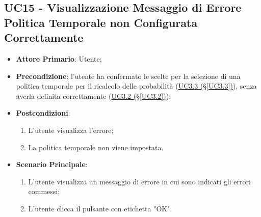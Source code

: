 \pagebreak

\subsection{UC15 - Visualizzazione Messaggio di Errore Politica Temporale non Configurata Correttamente}\label{UC15}
\begin{itemize}
\item \textbf{Attore Primario}: Utente;
\item \textbf{Precondizione}: l'utente ha confermato le scelte per la selezione di una politica temporale per il ricalcolo delle probabilità (\hyperref[UC3.3]{UC3.3 (§\ref*{UC3.3})}), senza averla definita correttamente (\hyperref[UC3.2]{UC3.2 (§\ref*{UC3.2})});
\item \textbf{Postcondizioni}: 
	\begin{enumerate}
	\item L'utente visualizza l'errore;
	\item La politica temporale non viene impostata.
	\end{enumerate}
\item \textbf{Scenario Principale}: 
	\begin{enumerate}
	\item L'utente visualizza un messaggio di errore in cui sono indicati gli errori commessi;
	\item L'utente clicca il pulsante con etichetta "OK".
	\end{enumerate}
\end{itemize}

\pagebreak

